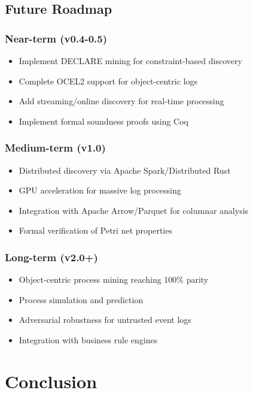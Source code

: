\documentclass[11pt,twocolumn]{article}
\begin{document}
\subsection{Future Roadmap}

\subsubsection{Near-term (v0.4-0.5)}
\begin{itemize}
    \item Implement DECLARE mining for constraint-based discovery
    \item Complete OCEL2 support for object-centric logs
    \item Add streaming/online discovery for real-time processing
    \item Implement formal soundness proofs using Coq
\end{itemize}

\subsubsection{Medium-term (v1.0)}
\begin{itemize}
    \item Distributed discovery via Apache Spark/Distributed Rust
    \item GPU acceleration for massive log processing
    \item Integration with Apache Arrow/Parquet for columnar analysis
    \item Formal verification of Petri net properties
\end{itemize}

\subsubsection{Long-term (v2.0+)}
\begin{itemize}
    \item Object-centric process mining reaching 100\% parity
    \item Process simulation and prediction
    \item Adversarial robustness for untrusted event logs
    \item Integration with business rule engines
\end{itemize}

\section{Conclusion}
\label{sec:conclusion}
\end{document}
